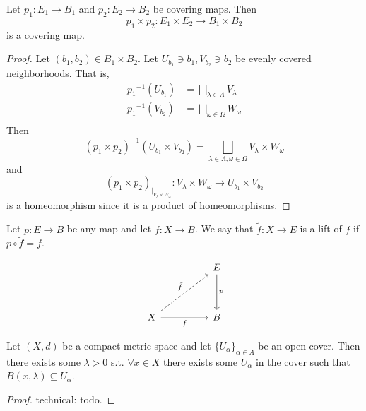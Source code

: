 \begin{theorem}
    Let \( p_1: E_1 \to B_1 \) and \( p_2: E_2 \to B_2 \)
    be covering maps.
    Then 
    \[
      p_1 \times p_2: E_1 \times E_2 \to B_1 \times B_2
    \]
    is a covering map.
\end{theorem}

\begin{proof}
    Let \( (b_1, b_2) \in B_1 \times B_2 \).
    Let \( U_{b_1} \ni b_1, V_{b_2} \ni b_2 \)
    be evenly covered neighborhoods.
    That is,
    \begin{align*}
      {p_1}^{-1} (U_{b_1}) &= \bigsqcup_{\lambda \in \Lambda}
      V_\lambda \\
      {p_1}^{-1} (V_{b_2}) &= \bigsqcup_{\omega \in \Omega}
      W_\omega \\
    \end{align*}
    Then
    \[
      {\left(p_1 \times p_2\right)}^{-1} (U_{b_1} \times V_{b_2})
      = \bigsqcup_{\lambda \in \Lambda, \omega \in \Omega} V_\lambda \times W_\omega
    \]
    and
    \[
      \left(p_1 \times p_2\right)_{|_{V_\lambda \times W_\omega}}
      : V_\lambda \times W_\omega \to U_{b_1} \times V_{b_2}
    \]
    is a homeomorphism since it is a product of homeomorphisms.
\end{proof}

\begin{definition}[Lift]
  Let \( p: E \to B \) be any map
  and let \( f: X \to B \).
  We say that \( \tilde{f}: X \to E \)
  is a lift of \( f \) if \( p \circ \tilde{f} = f \).

\[\begin{tikzcd}
	&& E \\
	\\
	X && B
	\arrow["p", from=1-3, to=3-3]
	\arrow["{\tilde{f}}", dashed, from=3-1, to=1-3]
	\arrow["f"', from=3-1, to=3-3]
\end{tikzcd}\]
\end{definition}

\begin{lemma}
   Let \( (X, d) \) be a compact metric space
   and let \( \{ U_\alpha  \}_{\alpha \in A}  \)
   be an open cover.
   Then there exists some \( \lambda > 0  \)
   s.t. \( \forall x \in X \)
   there exists some \( U_\alpha \) in 
   the cover such that
   \( B(x, \lambda) \subseteq U_\alpha \).
\end{lemma}

\begin{proof}
    technical: todo.
\end{proof}


